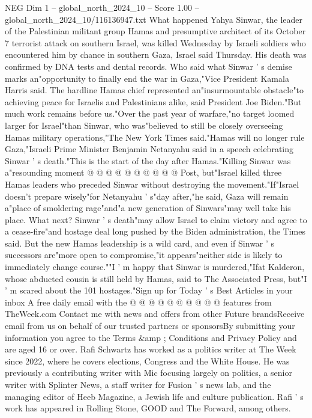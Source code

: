 \begin{textsample}{NEG Dim 1 – global\_north\_2024\_10 – Score 1.00 – global\_north\_2024\_10/116136947.txt}  \label{ex:f1_neg_372}
What happened Yahya Sinwar, the leader of the Palestinian militant group Hamas and presumptive architect of its October 7 terrorist attack on southern Israel, was killed Wednesday by Israeli soldiers who encountered him by chance in southern Gaza, Israel said Thursday.
His death was confirmed by DNA tests and dental records.
Who said what Sinwar ' s demise marks an"opportunity to finally end the war in Gaza,"Vice President Kamala Harris said.
The hardline Hamas chief represented an"insurmountable obstacle"to achieving peace for Israelis and Palestinians alike, said President Joe Biden."But much work remains before us."Over the past year of warfare,"no target loomed larger for Israel"than Sinwar, who was"believed to still be closely overseeing Hamas military operations,"The New York Times said."Hamas will no longer rule Gaza,"Israeli Prime Minister Benjamin Netanyahu said in a speech celebrating Sinwar ' s death."This is the start of the day after Hamas."Killing Sinwar was a"resounding moment @ @ @ @ @ @ @ @ @ @ Post, but"Israel killed three Hamas leaders who preceded Sinwar without destroying the movement."If"Israel doesn't prepare wisely"for Netanyahu ' s"day after,"he said, Gaza will remain a"place of smoldering rage"and"a new generation of Sinwars"may well take his place.
What next?
Sinwar ' s death"may allow Israel to claim victory and agree to a cease-fire"and hostage deal long pushed by the Biden administration, the Times said.
But the new Hamas leadership is a wild card, and even if Sinwar ' s successors are"more open to compromise,"it appears"neither side is likely to immediately change course.""I ' m happy that Sinwar is murdered,"Ifat Kalderon, whose abducted cousin is still held by Hamas, said to The Associated Press, but"I ' m scared about the 101 hostages."Sign up for Today ' s Best Articles in your inbox A free daily email with the @ @ @ @ @ @ @ @ @ @ features from TheWeek.com Contact me with news and offers from other Future brandsReceive email from us on behalf of our trusted partners or sponsorsBy submitting your information you agree to the Terms \&amp ; Conditions and Privacy Policy and are aged 16 or over.
Rafi Schwartz has worked as a politics writer at The Week since 2022, where he covers elections, Congress and the White House.
He was previously a contributing writer with Mic focusing largely on politics, a senior writer with Splinter News, a staff writer for Fusion ' s news lab, and the managing editor of Heeb Magazine, a Jewish life and culture publication.
Rafi ' s work has appeared in Rolling Stone, GOOD and The Forward, among others.

\end{textsample}
